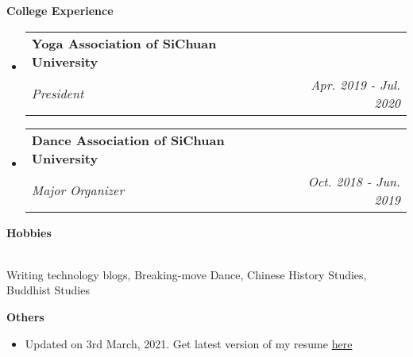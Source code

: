 \documentclass[letterpaper,11pt]{article}
\makeatletter
\newcommand{\resheading}[1]{{\large \colorbox{mygrey}{\begin{minipage}{\textwidth}{\textbf{#1 \vphantom{p\^{E}}}}\end{minipage}}}}
\newcommand{\ressubheading}[4]{
\begin{tabular*}{7.0in}{l@{\extracolsep{\fill}}r}
		\textbf{#1} & #2 \\
		\textit{#3} & \textit{#4} \\
\end{tabular*}\vspace{-6pt}}
\makeatother
\begin{document}
\resheading{College Experience}
\begin{itemize}
\item
	\ressubheading{Yoga Association of SiChuan University}{}{President}{Apr. 2019 - Jul. 2020}
\item
	\ressubheading{Dance Association of SiChuan University}{}{Major Organizer}{Oct. 2018 - Jun. 2019}
\end{itemize}


\resheading{Hobbies}
\\[9pt]
Writing technology blogs, \quad Breaking-move Dance, \quad Chinese History Studies, \quad Buddhist Studies
\\[12pt]

\resheading{Others}
\begin{itemize}
    \item Updated on 3rd March, 2021. Get latest version of my resume \href{https://github.com/Dynmi/Dynmi.github.io/blob/master/resume_wanghan_EN.pdf}{here} 
\end{itemize}
\end{document}
